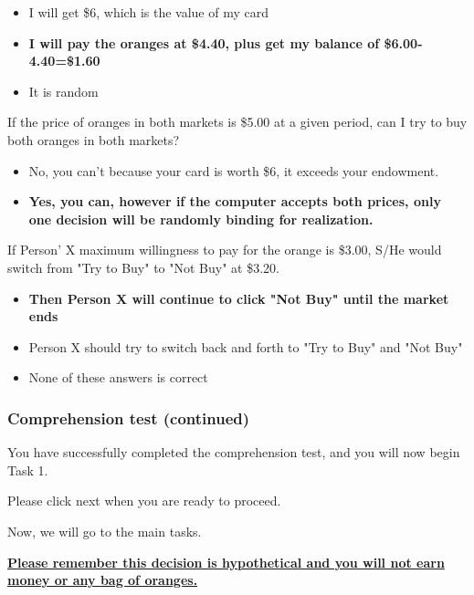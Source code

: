 \documentclass[12pt]{article}
\begin{document}
{\begin{itemize}
    \item I will get \$6, which is the value of my card
    \item \textbf{I will pay the oranges at \$4.40, plus get my balance of \$6.00-4.40=\$1.60}
    \item It is random
\end{itemize}

\vspace{0.5cm}


If the price of oranges in both markets is \$5.00 at a given period, can I try to buy both oranges in both markets?

\begin{itemize}
    \item No, you can’t because your card is worth \$6, it exceeds your endowment.
    \item \textbf{Yes, you can, however if the computer accepts both prices, only one decision will be randomly binding for realization.}
\end{itemize}

\vspace{0.5cm}

If Person' X maximum willingness to pay for the orange is \$3.00, S/He would switch from "Try to Buy" to "Not Buy" at \$3.20.

\begin{itemize}
    \item \textbf{Then Person X will continue to click "Not Buy" until the market ends}
    
    \item Person X should try to switch back and forth to "Try to Buy" and "Not Buy"
    \item None of these answers is correct
\end{itemize}

\clearpage



\subsubsection*{Comprehension test (continued)}

You have successfully completed the comprehension test, and you will now begin Task 1.

 Please click next when you are ready to proceed.

 Now, we will go to the main tasks. 
 
 \textbf{\underline{Please remember this decision is hypothetical and you will not earn money or any bag of oranges.}
}

}
\end{document}
